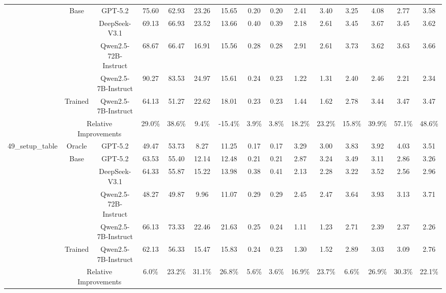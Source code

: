 \documentclass{article}
\theoremstyle{plain}
\theoremstyle{definition}
\theoremstyle{remark}
\begin{document}
\begin{table}[htbp]
{\begin{tabular}{c|c|r|cccccc|cccccc}
\cmidrule{2-15} & \multirow{4}[2]{*}{Base} & \multicolumn{1}{c|}{GPT-5.2} & 75.60 & 62.93 & 23.26 & 15.65 & 0.20 & 0.20 & 2.41 & 3.40 & 3.25 & 4.08 & 2.77 & 3.58  \\
            &       & \multicolumn{1}{c|}{DeepSeek-V3.1} & 69.13  & 66.93  & 23.52  & 13.66  & 0.40  & 0.39  & 2.18  & 2.61  & 3.45  & 3.67  & 3.45  & 3.62  \\
            &       & \multicolumn{1}{c|}{Qwen2.5-72B-Instruct} & 68.67  & 66.47  & 16.91  & 15.56  & 0.28  & 0.28  & 2.91  & 2.61  & 3.73  & 3.62  & 3.63  & 3.66  \\
            &       & \multicolumn{1}{c|}{Qwen2.5-7B-Instruct} & 90.27  & 83.53  & 24.97  & 15.61  & 0.24  & 0.23  & 1.22  & 1.31  & 2.40  & 2.46  & 2.21  & 2.34  \\
  \cmidrule{2-15}          & Trained & \multicolumn{1}{c|}{Qwen2.5-7B-Instruct} & 64.13  & 51.27  & 22.62  & 18.01  & 0.23  & 0.23  & 1.44  & 1.62  & 2.78  & 3.44  & 3.47  & 3.47  \\
  \cmidrule{2-15}          & \multicolumn{2}{c|}{Relative Improvements} & 29.0\% & 38.6\% & 9.4\% & -15.4\% & 3.9\% & 3.8\% & 18.2\% & 23.2\% & 15.8\% & 39.9\% & 57.1\% & 48.6\% \\
      \midrule
      \multirow{7}[8]{*}{49\_setup\_table} & Oracle & \multicolumn{1}{c|}{GPT-5.2} & 49.47 & 53.73 & 8.27 & 11.25 & 0.17 & 0.17 & 3.29 & 3.00 & 3.83 & 3.92 & 4.03 & 3.51  \\
\cmidrule{2-15} & \multirow{4}[2]{*}{Base} & \multicolumn{1}{c|}{GPT-5.2} & 63.53 & 55.40 & 12.14 & 12.48 & 0.21 & 0.21 & 2.87 & 3.24 & 3.49 & 3.11 & 2.86 & 3.26  \\
            &       & \multicolumn{1}{c|}{DeepSeek-V3.1} & 64.33  & 55.87  & 15.22  & 13.98  & 0.38  & 0.41  & 2.13  & 2.28  & 3.22  & 3.52  & 2.56  & 2.96  \\
            &       & \multicolumn{1}{c|}{Qwen2.5-72B-Instruct} & 48.27  & 49.87  & 9.96  & 11.07  & 0.29  & 0.29  & 2.45  & 2.47  & 3.64  & 3.93  & 3.13  & 3.71  \\
            &       & \multicolumn{1}{c|}{Qwen2.5-7B-Instruct} & 66.13  & 73.33  & 22.46  & 21.63  & 0.25  & 0.24  & 1.11  & 1.23  & 2.71  & 2.39  & 2.37  & 2.26  \\
  \cmidrule{2-15}          & Trained & \multicolumn{1}{c|}{Qwen2.5-7B-Instruct} & 62.13  & 56.33  & 15.47  & 15.83  & 0.24  & 0.23  & 1.30  & 1.52  & 2.89  & 3.03  & 3.09  & 2.76  \\
  \cmidrule{2-15}          & \multicolumn{2}{c|}{Relative Improvements} & 6.0\% & 23.2\% & 31.1\% & 26.8\% & 5.6\% & 3.6\% & 16.9\% & 23.7\% & 6.6\% & 26.9\% & 30.3\% & 22.1\% \\
      \bottomrule
      \end{tabular}%
      }
    \label{apx:tab:cwah}%
  \end{table}%
  
\end{document}
